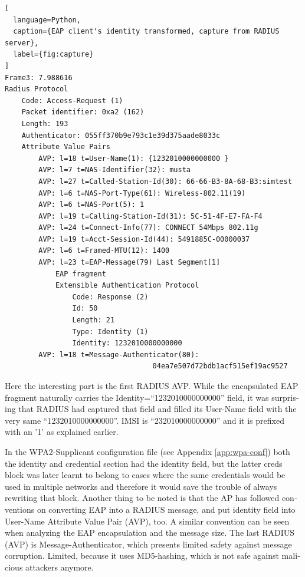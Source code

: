 \documentclass[12pt,a4paper,english]{tutthesis}
\begin{document}
\begin{otherlanguage}{english}
\renewcommand{\lstlistingname}{Capture}
\begin{lstlisting}[
  language=Python,
  caption={EAP client's identity transformed, capture from RADIUS server},
  label={fig:capture}
]
Frame3: 7.988616
Radius Protocol
    Code: Access-Request (1)
    Packet identifier: 0xa2 (162)
    Length: 193
    Authenticator: 055ff370b9e793c1e39d375aade8033c
    Attribute Value Pairs
        AVP: l=18 t=User-Name(1): {1232010000000000 }
        AVP: l=7 t=NAS-Identifier(32): musta
        AVP: l=27 t=Called-Station-Id(30): 66-66-B3-8A-68-B3:simtest
        AVP: l=6 t=NAS-Port-Type(61): Wireless-802.11(19)
        AVP: l=6 t=NAS-Port(5): 1
        AVP: l=19 t=Calling-Station-Id(31): 5C-51-4F-E7-FA-F4
        AVP: l=24 t=Connect-Info(77): CONNECT 54Mbps 802.11g
        AVP: l=19 t=Acct-Session-Id(44): 5491885C-00000037
        AVP: l=6 t=Framed-MTU(12): 1400
        AVP: l=23 t=EAP-Message(79) Last Segment[1]
            EAP fragment
            Extensible Authentication Protocol
                Code: Response (2)
                Id: 50
                Length: 21
                Type: Identity (1)
                Identity: 1232010000000000
        AVP: l=18 t=Message-Authenticator(80):
                                   04ea7e507d72bdb1acf515ef19ac9527
\end{lstlisting}
\normalsize


Here the interesting part is the first RADIUS AVP.
While the encapsulated EAP fragment naturally carries the Identity=``1232010000000000''
field, it was surprising that RADIUS had captured that field and 
filled its User-Name field with the very same ``1232010000000000''. 
IMSI is ``232010000000000'' and it is prefixed with
an '1' as  explained earlier.

In  the WPA2-Supplicant configuration file (see Appendix \ref{app:wpa-conf}) both the identity and
credential section had the identity field, but the latter creds block
was later learnt to belong to cases where the same credentials would
be used in multiple networks and therefore it would save the trouble of
always rewriting that block.
Another thing to be noted is that the AP has followed conventions on
converting EAP into a RADIUS message, and put identity field into
User-Name Attribute Value Pair (AVP), too.
A similar convention can be seen when analyzing the EAP encapsulation and
the message size. The last RADIUS (AVP) is 
Message-Authenticator, which presents limited safety against message 
corruption. Limited, because it uses MD5-hashing, which is not safe
against malicious attackers anymore.




\end{otherlanguage}
\end{document}
